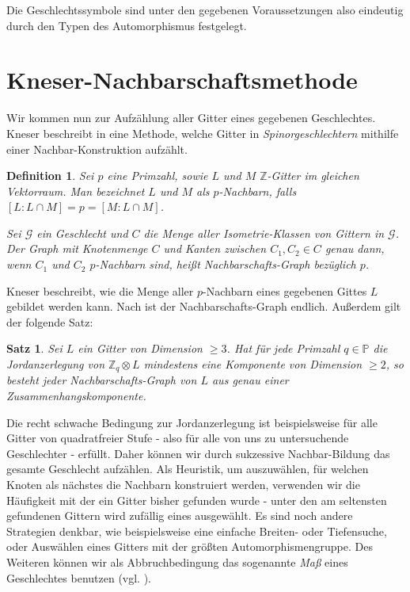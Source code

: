\documentclass[12pt,a4paper,halfparskip,headsepline,bibtotocnumbered]{scrreprt}
\theoremstyle{nummermitklammern}
\newtheorem{definition}[defsatzusw]{Definition}
\newtheorem{satz}[defsatzusw]{Satz}
\theoremstyle{nonumberbreak}
\newcommand{\Z}{\mathbb{Z}}
\renewcommand{\P}{\mathbb{P}}
\begin{document}
Die Geschlechtssymbole sind unter den gegebenen Voraussetzungen also eindeutig durch den Typen des Automorphismus festgelegt.

\section{Kneser-Nachbarschaftsmethode}

Wir kommen nun zur Aufzählung aller Gitter eines gegebenen Geschlechtes. Kneser beschreibt in \cite[Abschnitt 28]{kneser} eine Methode, welche Gitter in \textit{Spinorgeschlechtern} mithilfe einer Nachbar-Konstruktion aufzählt.

\begin{framed}
	\begin{definition}
		Sei $p$ eine Primzahl, sowie $L$ und $M$ $\Z$-Gitter im gleichen Vektorraum. Man bezeichnet $L$ und $M$ als \textit{$p$-Nachbarn}, falls $\left[ L : L \cap M \right] = p = \left[ M : L \cap M \right]$.\par
		Sei $\mathcal{G}$ ein Geschlecht und $C$ die Menge aller Isometrie-Klassen von Gittern in $\mathcal{G}$. Der Graph mit Knotenmenge $C$ und Kanten zwischen $C_1, C_2 \in C$ genau dann, wenn $C_1$ und $C_2$ $p$-Nachbarn sind, heißt \textit{Nachbarschafts-Graph} bezüglich $p$.
	\end{definition}
\end{framed}

Kneser beschreibt, wie die Menge aller $p$-Nachbarn eines gegebenen Gittes $L$ gebildet werden kann.  Nach \cite{scharlau} ist der Nachbarschafts-Graph endlich. Außerdem gilt der folgende Satz:

\begin{framed}
	\begin{satz}\label{th:neighbourgraph}
		Sei $L$ ein Gitter von Dimension $\geq 3$. Hat für jede Primzahl $q \in \P$ die Jordanzerlegung von $\Z_q \otimes L$ mindestens eine Komponente von Dimension $\geq 2$, so besteht jeder Nachbarschafts-Graph von $L$ aus genau einer Zusammenhangskomponente.
	\end{satz}
\end{framed}

Die recht schwache Bedingung zur Jordanzerlegung ist beispielsweise für alle Gitter von quadratfreier Stufe - also für alle von uns zu untersuchende Geschlechter - erfüllt. Daher können wir durch sukzessive Nachbar-Bildung das gesamte Geschlecht aufzählen. Als Heuristik, um auszuwählen, für welchen Knoten als nächstes die Nachbarn konstruiert werden, verwenden wir die Häufigkeit mit der ein Gitter bisher gefunden wurde - unter den am seltensten gefundenen Gittern wird zufällig eines ausgewählt. Es sind noch andere Strategien denkbar, wie beispielsweise eine einfache Breiten- oder Tiefensuche, oder Auswählen eines Gitters mit der größten Automorphismengruppe. Des Weiteren können wir als Abbruchbedingung das sogenannte \textit{Maß} eines Geschlechtes benutzen (vgl. \cite[Abschnitt 35]{kneser}).
\end{document}
